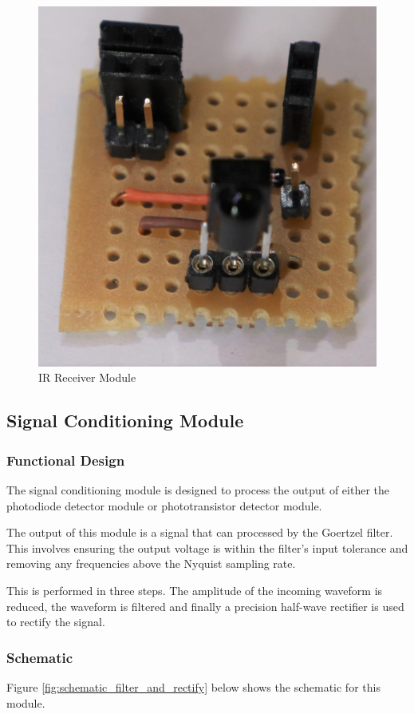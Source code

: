 \begin{figure}[H]
	\centering
	\includegraphics[width=.6\textwidth]{figures/modules/ir_receiver.jpg}
	\caption{IR Receiver Module}
	\label{fig:module_ir_receiver}
\end{figure}






\subsection{Signal Conditioning Module}
\label{sec:signal_conditioning_module}

\subsubsection{Functional Design}
The signal conditioning module is designed to process the output of either the photodiode detector module or phototransistor detector module.

The output of this module is a signal that can processed by the Goertzel filter. This involves ensuring the output voltage is within the filter's input tolerance and removing any frequencies above the Nyquist sampling rate.

This is performed in three steps. The amplitude of the incoming waveform is reduced, the waveform is filtered and finally a precision half-wave rectifier is used to rectify the signal.

\subsubsection{Schematic}
Figure \ref{fig:schematic_filter_and_rectify} below shows the schematic for this module.

